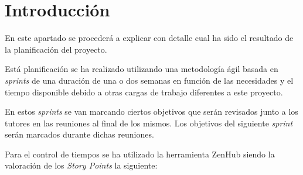 
\section{Introducción}

En este apartado se procederá a explicar con detalle cual ha sido el resultado de la planificación del proyecto.

Está planificación se ha realizado utilizando  una metodología ágil basada en \emph{sprints} de una duración de una o dos semanas en función de las necesidades y el tiempo disponible debido a otras cargas de trabajo diferentes a este proyecto.

En estos \emph{sprints} se van marcando ciertos objetivos que serán revisados junto a los tutores en las reuniones al final de los mismos. Los objetivos del siguiente \emph{sprint} serán marcados durante dichas reuniones.
 
Para el control de tiempos se ha utilizado la herramienta ZenHub siendo la valoración de los \emph{Story Points} la siguiente:

\begin{comment}
\begin{table}[]
\begin{center}
\begin{tabular}{|l|l|}
\hline
Story Points & Estimación temporal \\ \hline
1            & 30 min              \\ \hline
2            & 1 hora              \\ \hline
3            & 1,5 horas           \\ \hline
4            & 2 horas             \\ \hline
5            & 2,5 horas           \\ \hline
6            & 3 horas             \\ \hline
7            & 3,5 horas           \\ \hline
8            & 4 horas             \\ \hline
9            & 6 horas             \\ \hline
10           & 8 horas             \\ \hline
\end{tabular}
\caption{Equivalencias \emph{Story Points} y tiempo estimado}
\label{tabla:StoryPoints/tiempo}
\end{center}
\end{table}
\end{comment}

